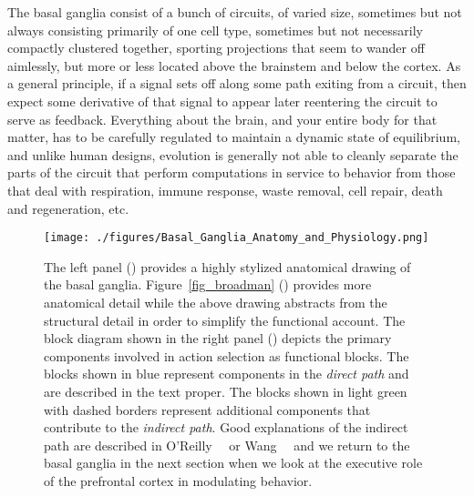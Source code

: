 The basal ganglia consist of a bunch of circuits, of varied size, sometimes but not always consisting primarily of one cell type, sometimes but not necessarily compactly clustered together, sporting projections that seem to wander off aimlessly, but more or less located above the brainstem and below the cortex. As a general principle, if a signal sets off along some path exiting from a circuit, then expect some derivative of that signal to appear later reentering the circuit to serve as feedback. Everything about the brain, and your entire body for that matter, has to be carefully regulated to maintain a dynamic state of equilibrium, and unlike human designs, evolution is generally not able to cleanly separate the parts of the circuit that perform computations in service to behavior from those that deal with respiration, immune response, waste removal, cell repair, death and regeneration, etc. 


\begin{figure}
%
  \begin{center}
    \texttt{[image: ./figures/Basal\_Ganglia\_Anatomy\_and\_Physiology.png]} %
  \end{center}
%
  \caption{The left panel ({}) provides a highly stylized anatomical drawing of the basal ganglia. Figure~\ref{fig_broadman} ({}) provides more anatomical detail while the above drawing abstracts from the structural detail in order to simplify the functional account. The block diagram shown in the right panel ({}) depicts the primary components involved in action selection as functional blocks. The blocks shown in blue represent components in the {\it{direct path}} and are described in the text proper. The blocks shown in light green with dashed borders represent additional components that contribute to the {\it{indirect path}}. Good explanations of the indirect path are described in O'Reilly~\etal{}~\cite{OReillyetalCCN-12} or Wang~\etal{}~\cite{WangetalNATURE-NEUROSCIENCE-18} and we return to the basal ganglia in the next section when we look at the executive role of the prefrontal cortex in modulating behavior.}
%
  \label{fig_basal}
%
\end{figure}

